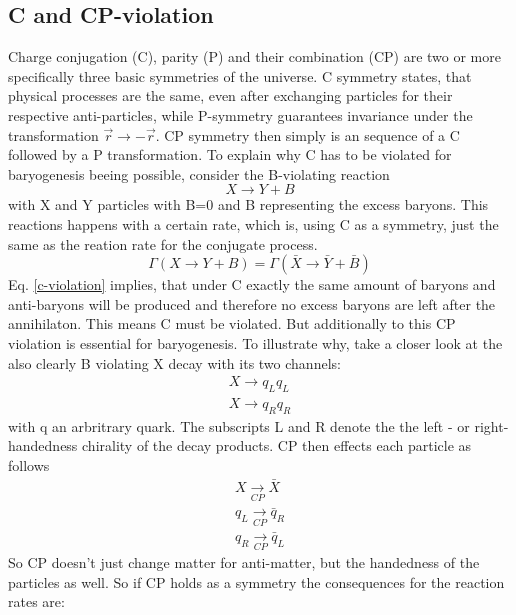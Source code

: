 \subsection{C and CP-violation}
Charge conjugation (C), parity (P) and their combination (CP) are two or more specifically three basic symmetries of the universe. C symmetry states, that physical processes are the same, even after exchanging particles for their respective anti-particles, while P-symmetry guarantees invariance under the transformation $\vec{r}\rightarrow-\vec{r}$. CP symmetry then simply is an sequence of a C followed by a P transformation. \newline
To explain why C has to be violated for baryogenesis beeing possible, consider the B-violating reaction
\begin{equation*}
	X\rightarrow Y+B
\end{equation*}
with X and Y particles with B=0 and B representing the excess baryons. This reactions happens with a certain rate, which is, using C as a symmetry, just the same as the reation rate for the conjugate process.
\begin{equation}
	\Gamma(X\rightarrow Y+B)=\Gamma(\bar{X}\rightarrow \bar{Y}+\bar{B})
	\label{c-violation}
\end{equation}
Eq. \ref{c-violation} implies, that under C exactly the same amount of baryons and anti-baryons will be produced and therefore no excess baryons are left after the annihilaton. This means C must be violated. \newline
But additionally to this CP violation is essential for baryogenesis. To illustrate why, take a closer look at the also clearly B  violating X decay with its two channels:
\begin{align*}
	X\rightarrow q_Lq_L\\
	X\rightarrow q_Rq_R
\end{align*}
with q an arbritrary quark. The subscripts L and R denote the the left - or right-handedness chirality of the decay products. CP then effects each particle as follows
\begin{align*}
	X\underset{CP}{\longrightarrow}\bar{X}\\
	q_{L}\underset{CP}{\longrightarrow}\bar{q}_{R}\\
	q_{R}\underset{CP}{\longrightarrow}\bar{q}_{L}
\end{align*}
So CP doesn't just change matter for anti-matter, but the handedness of the particles as well. So if CP holds as a symmetry the consequences for the reaction rates are:
